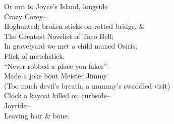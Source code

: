Or out to Joyce's Island, longside \\
Crazy Corey-- \\
Hoghunted; broken sticks on rotted bridge, \& \\
The Greatest Novelist of Taco Bell; \\ 
In gravelyard we met a child named Osiris; \\
Flick of matchstick, \\
``Never robbed a place you faker''-- \\
Made a joke bout Meister Jimmy \\
(Too much devil's breath, a mummy's swaddled visit) \\
Clock a kayoat killed on curbside-- \\
Joyride-- \\
Leaving hair \& bone.